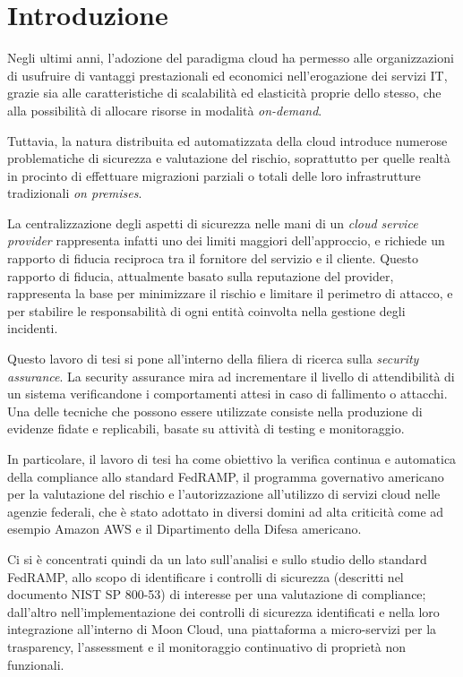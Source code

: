 \documentclass[../main.tex]{subfiles}
\begin{document}
\chapter*{Introduzione}

Negli ultimi anni, l'adozione del paradigma cloud ha permesso alle organizzazioni di usufruire di vantaggi prestazionali ed economici nell'erogazione dei servizi IT, grazie sia alle caratteristiche di scalabilità ed elasticità proprie dello stesso, che alla possibilità di allocare risorse in modalità \textit{on-demand}.


Tuttavia, la natura distribuita ed automatizzata della cloud introduce numerose problematiche di sicurezza e valutazione del rischio, soprattutto per quelle realtà in procinto di effettuare migrazioni parziali o totali delle loro infrastrutture tradizionali \emph{on premises}.


La centralizzazione degli aspetti di sicurezza nelle mani di un \textit{cloud service provider} rappresenta infatti uno dei limiti maggiori dell'approccio, e richiede un rapporto di fiducia reciproca tra il fornitore del servizio e il cliente. Questo rapporto di fiducia, attualmente basato sulla reputazione del provider, rappresenta la base per minimizzare il rischio e limitare il perimetro di attacco, e per stabilire le responsabilità di ogni entità coinvolta nella gestione degli incidenti.


Questo lavoro di tesi si pone all'interno della filiera di ricerca sulla \textit{security assurance}.
La security assurance mira ad incrementare il livello di attendibilità di un sistema verificandone i comportamenti attesi in caso di fallimento o attacchi.
Una delle tecniche che possono essere utilizzate consiste nella produzione di evidenze fidate e replicabili, basate su attività di testing e monitoraggio.


In particolare, il lavoro di tesi ha come obiettivo la verifica continua e automatica della compliance allo standard FedRAMP, il programma governativo americano per la valutazione del rischio e l'autorizzazione all'utilizzo di servizi cloud nelle agenzie federali, che è stato adottato in diversi domini ad alta criticità come ad esempio Amazon AWS e il Dipartimento della Difesa americano.

Ci si è concentrati quindi da un lato sull'analisi e sullo studio dello standard FedRAMP, allo scopo di identificare i controlli di sicurezza (descritti nel documento NIST SP 800-53) di interesse per una valutazione di compliance; dall'altro nell'implementazione dei controlli di sicurezza identificati e nella loro integrazione all'interno di Moon Cloud, una piattaforma a micro-servizi per la trasparency, l'assessment e il monitoraggio continuativo di proprietà non funzionali.
\end{document}
